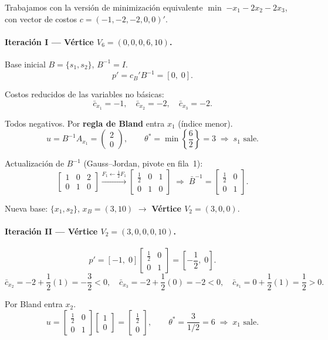 Trabajamos con la versión de minimización equivalente
$\min\;{-x_1-2x_2-2x_3}$, con vector de costos $c=(-1,-2,-2,0,0)'$.

\paragraph{Iteración I — Vértice $V_6=(0,0,0,6,10)$.}
Base inicial $B=\{s_1,s_2\}$, $B^{-1}=I$.
\[
  p' = c_B'B^{-1} = [0,\;0].
\]

Costos reducidos de las variables no básicas:
\[
  \bar c_{x_1}=-1,\quad \bar c_{x_2}=-2,\quad \bar c_{x_3}=-2.
\]

Todos negativos. Por \textbf{regla de Bland} entra $x_1$ (índice menor).
\[
  u = B^{-1}A_{x_1} = \begin{pmatrix}
      2 \\ 0
  \end{pmatrix}, \qquad
  \theta^* = \min\!\left\{\frac{6}{2}\right\} = 3
  \;\Rightarrow\; s_1 \text{ sale}.
\]

Actualización de $B^{-1}$ (Gauss--Jordan, pivote en fila~1):
\[
  \left[\begin{array}{cc|c}1&0&2\\0&1&0\end{array}\right]
  \xrightarrow{F_1\leftarrow\frac{1}{2}F_1}
  \left[\begin{array}{cc|c}\frac{1}{2}&0&1\\0&1&0\end{array}\right]
  \;\Rightarrow\;
  \bar{B}^{-1}=\begin{bmatrix}\frac{1}{2}&0\\0&1\end{bmatrix}.
\]

Nueva base: $\{x_1,s_2\}$, $x_B=(3,10)$ $\to$ \textbf{Vértice $V_2=(3,0,0)$}.

\paragraph{Iteración II — Vértice $V_2=(3,0,0,0,10)$.}
\[
  p' = [-1,\;0]\begin{bmatrix}\frac{1}{2}&0\\0&1\end{bmatrix}
      = \left[-\frac{1}{2},\;0\right].
\]
\[
  \bar c_{x_2} = -2+\frac{1}{2}(1) = -\frac{3}{2}<0,\quad
  \bar c_{x_3} = -2+\frac{1}{2}(0) = -2<0,\quad
  \bar c_{s_1} = 0+\frac{1}{2}(1) = \frac{1}{2}>0.
\]

Por Bland entra $x_2$.
\[
  u = \begin{bmatrix}\frac{1}{2}&0\\0&1\end{bmatrix}\begin{bmatrix}
      1 \\ 0
  \end{bmatrix}
    = \begin{bmatrix}
        \frac{1}{2} \\ 0
    \end{bmatrix}, \qquad
  \theta^* = \frac{3}{1/2} = 6
  \;\Rightarrow\; x_1 \text{ sale}.
\]

